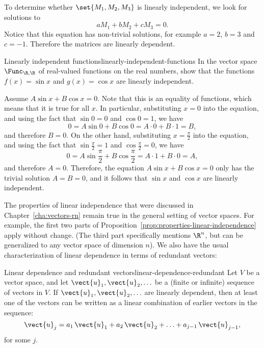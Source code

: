 \begin{solution}
  To determine whether $\set{M_1,M_2,M_3}$ is linearly independent, we
  look for solutions to
  \begin{equation*}
    aM_1 + bM_2 + cM_3 = 0.
  \end{equation*}
  Notice that this equation has non-trivial solutions, for example
  $a=2$, $b=3$ and $c=-1$. Therefore the matrices are linearly
  dependent.
\end{solution}

\begin{example}{Linearly independent functions}{linearly-independent-functions}
  In the vector space $\Func_{\R,\R}$ of real-valued functions on the
  real numbers, show that the functions $f(x)=\sin x$ and $g(x)=\cos
  x$ are linearly independent.
\end{example}

\begin{solution}
  Assume $A\sin x+B\cos x=0$. Note that this is an equality of
  functions, which means that it is true for all $x$. In particular,
  substituting $x=0$ into the equation, and using the fact that
  $\sin 0=0$ and $\cos 0=1$, we have
  \begin{equation*}
    0 = A\sin 0 + B\cos 0 = A\cdot 0 + B\cdot 1 = B,
  \end{equation*}
  and therefore $B=0$. On the other hand, substituting
  $x=\frac{\pi}{2}$ into the equation, and using the fact that
  $\sin\frac{\pi}{2} = 1$ and $\cos\frac{\pi}{2}=0$, we have
  \begin{equation*}
    0 = A\sin\frac{\pi}{2} + B\cos\frac{\pi}{2} = A\cdot 1 + B\cdot 0
    = A,
  \end{equation*}
  and therefore $A=0$. Therefore, the equation $A\sin x+B\cos x=0$
  only has the trivial solution $A=B=0$, and it follows that $\sin x$
  and $\cos x$ are linearly independent.
\end{solution}

The properties of linear independence that were discussed in
Chapter~\ref{cha:vectors-rn} remain true in the general setting of
vector spaces. For example, the first two parts of
Proposition~\ref{prop:properties-linear-independence} apply without change.
(The third part specifically mentions $\R^n$, but can be generalized
to any vector space of dimension $n$). We also have the usual
characterization of linear dependence in terms of redundant vectors:

\begin{proposition}{Linear dependence and redundant vectors}{linear-dependence-redundant}
  Let $V$ be a vector space, and let $\vect{u}_1,\vect{u}_2,\ldots$ be
  a (finite or infinite) sequence of vectors in $V$. If
  $\vect{u}_1,\vect{u}_2,\ldots$ are linearly dependent, then at least
  one of the vectors can be written as a linear combination of earlier
  vectors in the sequence:
  \begin{equation*}
    \vect{u}_j = a_1\,\vect{u}_1 + a_2\,\vect{u}_2 + \ldots + a_{j-1}\,\vect{u}_{j-1},
  \end{equation*}
  for some $j$.
\end{proposition}

